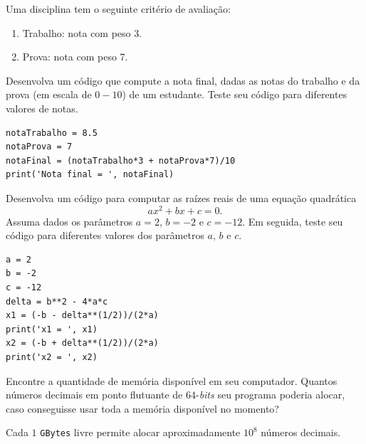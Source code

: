 \begin{exer}
  Uma disciplina tem o seguinte critério de avaliação:
  \begin{enumerate}
  \item Trabalho: nota com peso 3.
  \item Prova: nota com peso 7.
  \end{enumerate}
  Desenvolva um código {\python} que compute a nota final, dadas as notas do trabalho e da prova (em escala de $0 - 10$) de um estudante. Teste seu código para diferentes valores de notas.
\end{exer}
\begin{resp}

\begin{lstlisting}
notaTrabalho = 8.5
notaProva = 7
notaFinal = (notaTrabalho*3 + notaProva*7)/10
print('Nota final = ', notaFinal)
\end{lstlisting}

\end{resp}

\begin{exer}
  Desenvolva um código {\python} para computar as raízes reais de uma equação quadrática
  \begin{equation}
    ax^2 + bx + c = 0.
  \end{equation}
  Assuma dados os parâmetros $a=2$, $b=-2$ e $c=-12$. Em seguida, teste seu código para diferentes valores dos parâmetros $a$, $b$ e $c$.
\end{exer}
\begin{resp}

\begin{lstlisting}
a = 2
b = -2
c = -12
delta = b**2 - 4*a*c
x1 = (-b - delta**(1/2))/(2*a)
print('x1 = ', x1)
x2 = (-b + delta**(1/2))/(2*a)
print('x2 = ', x2)
\end{lstlisting}

\end{resp}

\begin{exer}
  Encontre a quantidade de memória disponível em seu computador. Quantos números decimais em ponto flutuante de $64$-\textit{bits} seu programa poderia alocar, caso conseguisse usar toda a memória disponível no momento?
\end{exer}
\begin{resp}
  Cada $1$ \texttt{GBytes} livre permite alocar aproximadamente $10^8$ números decimais.
\end{resp}

